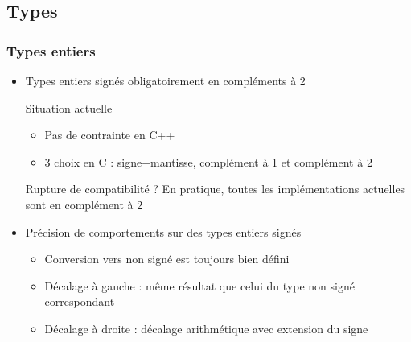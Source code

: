 \documentclass[C++.tex]{subfiles}
\begin{document}
\subsection*{Types}
\begin{frame}[fragile]
	\frametitle{Types entiers}
	\begin{itemize}
		\item Types entiers signés obligatoirement en compléments à 2

		\begin{block}{Situation actuelle}
			\begin{itemize}
				\item Pas de contrainte en C++
				\item 3 choix en C : signe+mantisse, complément à 1 et complément à 2
			\end{itemize}
		\end{block}


		\begin{alertblock}{Rupture de compatibilité ?}
			En pratique, toutes les implémentations actuelles sont en complément à 2
		\end{alertblock}

		\item Précision de comportements sur des types entiers signés
		\begin{itemize}
			\item Conversion vers non signé est toujours bien défini


			\item Décalage à gauche : même résultat que celui du type non signé correspondant
			\item Décalage à droite : décalage arithmétique avec extension du signe
		\end{itemize}
	\end{itemize}
\end{frame}
\end{document}

